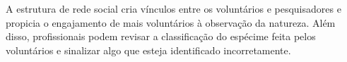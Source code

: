 A estrutura de rede social cria vínculos entre os voluntários e pesquisadores e propicia o engajamento de mais voluntários à observação da natureza. Além disso, profissionais podem revisar a classificação do espécime feita pelos voluntários e sinalizar algo que esteja identificado incorretamente.



